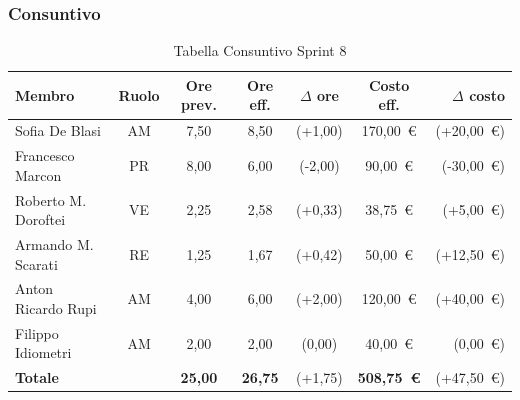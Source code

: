\subsubsection{Consuntivo}
\begin{table}[H]
    \centering
    \renewcommand{\arraystretch}{1.3}
    \begin{tabularx}{\textwidth}{|X|c|c|c|c|c|r|}
        \hline
        \textbf{Membro} & \textbf{Ruolo} & \textbf{Ore prev.} &
        \textbf{Ore eff.} & \textbf{$\Delta$ ore} &
        \textbf{Costo eff.} & \textbf{$\Delta$ costo} \\
        \hline
        Sofia De Blasi       & AM & 7,50 & 8,50 & {\color{red}(+1,00)}  & 170{,}00~\euro & {\color{red}(+20{,}00~\euro)} \\
        Francesco Marcon     & PR & 8,00 & 6,00 & {\color{green}(-2,00)} & 90{,}00~\euro  & {\color{green}(-30{,}00~\euro)} \\
        Roberto M. Doroftei  & VE & 2,25 & 2,58 & {\color{red}(+0,33)} & 38{,}75~\euro  & {\color{red}(+5{,}00~\euro)} \\
        Armando M. Scarati   & RE & 1,25 & 1,67 & {\color{red}(+0,42)}  & 50{,}00~\euro  & {\color{red}(+12{,}50~\euro)} \\
        Anton Ricardo Rupi   & AM & 4,00 & 6,00 & {\color{red}(+2,00)}  & 120{,}00~\euro & {\color{red}(+40{,}00~\euro)} \\
        Filippo Idiometri    & AM & 2,00 & 2,00 & {\color{green}(0,00)} & 40{,}00~\euro  & {\color{green}(0{,}00~\euro)} \\
        \hline
        \textbf{Totale} & & \textbf{25,00} & \textbf{26,75} & {\color{red}(+1,75)} & \textbf{508{,}75~\euro} & {\color{red}(+47{,}50~\euro)} \\
        \hline
    \end{tabularx}
    \caption{Tabella Consuntivo Sprint 8}
\end{table}

